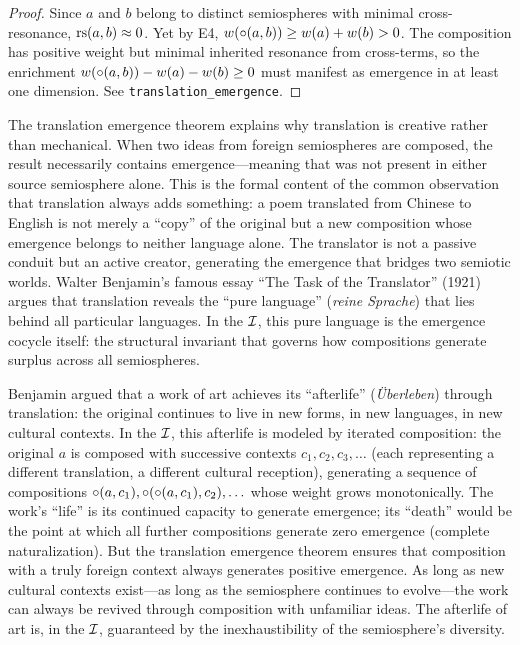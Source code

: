 \begin{proof}
Since $a$ and $b$ belong to distinct semiospheres with minimal cross-resonance, $\mathrm{rs}(a, b) \approx 0$. Yet by E4, $w(\circ(a, b)) \geq w(a) + w(b) > 0$. The composition has positive weight but minimal inherited resonance from cross-terms, so the enrichment $w(\circ(a, b)) - w(a) - w(b) \geq 0$ must manifest as emergence in at least one dimension. See \texttt{translation\_emergence}.
\end{proof}

\begin{interpretation}
The translation emergence theorem explains why translation is creative rather than mechanical. When two ideas from foreign semiospheres are composed, the result necessarily contains emergence---meaning that was not present in either source semiosphere alone. This is the formal content of the common observation that translation always adds something: a poem translated from Chinese to English is not merely a ``copy'' of the original but a new composition whose emergence belongs to neither language alone. The translator is not a passive conduit but an active creator, generating the emergence that bridges two semiotic worlds. Walter Benjamin's famous essay ``The Task of the Translator'' (1921) argues that translation reveals the ``pure language'' (\textit{reine Sprache}) that lies behind all particular languages. In the $\mathcal{I}$, this pure language is the emergence cocycle itself: the structural invariant that governs how compositions generate surplus across all semiospheres.
\end{interpretation}

\begin{remark}
Benjamin argued that a work of art achieves its ``afterlife'' (\textit{\"Uberleben}) through translation: the original continues to live in new forms, in new languages, in new cultural contexts. In the $\mathcal{I}$, this afterlife is modeled by iterated composition: the original $a$ is composed with successive contexts $c_1, c_2, c_3, \ldots$ (each representing a different translation, a different cultural reception), generating a sequence of compositions $\circ(a, c_1), \circ(\circ(a, c_1), c_2), \ldots$ whose weight grows monotonically. The work's ``life'' is its continued capacity to generate emergence; its ``death'' would be the point at which all further compositions generate zero emergence (complete naturalization). But the translation emergence theorem ensures that composition with a truly foreign context always generates positive emergence. As long as new cultural contexts exist---as long as the semiosphere continues to evolve---the work can always be revived through composition with unfamiliar ideas. The afterlife of art is, in the $\mathcal{I}$, guaranteed by the inexhaustibility of the semiosphere's diversity.
\end{remark}

